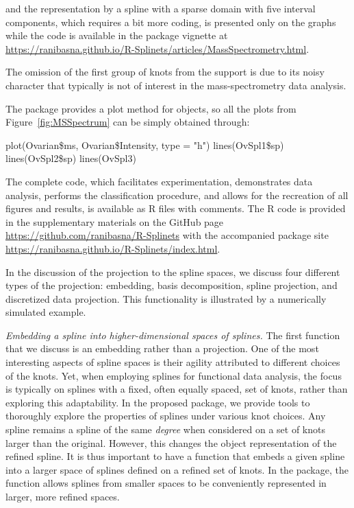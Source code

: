 \noindent and the representation by a spline  with a sparse domain with five interval components, which requires a bit more coding, is presented only on the graphs while the code is available in the package vignette at \url{https://ranibasna.github.io/R-Splinets/articles/MassSpectrometry.html}.

\noindent The omission of the first group of knots from the support is due to its noisy character that typically is not of interest in the mass-spectrometry data analysis.

\noindent The package provides a plot method for  objects, so all the plots from Figure~\ref{fig:MSSpectrum} can be simply obtained through:
\begin{example}
plot(Ovarian\$ms, Ovarian\$Intensity, type = "h")
lines(OvSpl1\$sp)
lines(OvSpl2\$sp) 
lines(OvSpl3)
\end{example}

 The complete code, which facilitates experimentation, demonstrates data analysis, performs the classification procedure, and allows for the recreation of all figures and results, is available as R files with comments. The R code is provided in the supplementary materials on the {GitHub page} \url{https://github.com/ranibasna/R-Splinets} with the accompanied {package site} \url{https://ranibasna.github.io/R-Splinets/index.html}.

 In the discussion of the projection to the spline spaces, we discuss four different types of the projection: embedding, basis decomposition, spline projection, and discretized data projection. 
This functionality is illustrated by a numerically simulated example.

\noindent\emph{Embedding a spline into higher-dimensional spaces of splines.} 
The first function that we discuss is an embedding rather than a projection. 
One of the most interesting aspects of spline spaces is their agility attributed to different choices of the knots.
Yet, when employing splines for functional data analysis, the focus is typically on splines with a fixed, often equally spaced, set of knots, rather than exploring this adaptability.
In the proposed package, we provide tools to thoroughly explore the properties of splines under various knot choices. 
Any spline remains a spline of the same \emph{degree} when considered on a set of knots larger than the original.
However, this changes the  object representation of the refined spline. 
It is thus important to have a function that embeds a given spline into a larger space of splines defined on a refined set of knots. 
In the package, the function  allows splines from smaller spaces to be conveniently represented in larger, more refined spaces.

